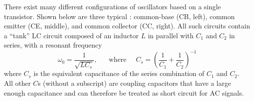 \begin{itemize}



\begin{comment}
The op-amp circuit shown in the figure has both positive and negative
feedback branches. If the voltage to non-inverting input $V_+$ is 
considered as the input, the circuit is a non-inverting amplifier 
with gain:
\[
A=\frac{V_o}{V_+}=1+\frac{R_f}{R_3}=K
\]
On the other hand, the positive feedback gain is
\[
B(j\omega)=\frac{V_+}{V'_o}=\frac{Z_1}{Z_1+Z_2}
=\frac{R_1||1/j\omega C_1}{R_1||1/j\omega C_1+R_2+1/j\omega C_2}
\]
\end{comment}

There exist many different configurations of oscillators based on a
single transistor. Shown below are three typical 
:
common-base (CB, left), common emitter (CE, middle), and common 
collector (CC, right). All such circuits contain a ``tank'' LC circuit
composed of an inductor $L$ in parallel with $C_1$ and $C_2$ in series, 
with a resonant frequency 
\[
\omega_0=\frac{1}{\sqrt{LC_s}},\;\;\;\;\;\;\mbox{where}\;\;\;\;\;
C_s=\left(\frac{1}{C_1}+\frac{1}{C_2}\right)^{-1}
\]
where $C_s$ is the equivalent capacitance of the series combination 
of $C_1$ and $C_2$. All other $C$s (without a subscript) are coupling
capacitors that have a large enough capacitance and can therefore be 
treated as short circuit for AC signals. 



\end{itemize}
